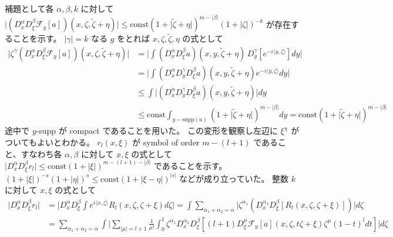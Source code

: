 \begin{Proof}
\itemthen
  補題として各 \(\alpha , \beta , k\) に対して \(\lvert (D^\alpha_x D^\beta_\xi \mathscr{F}_y[a])(x , \zeta , \tilde{\zeta} + \eta) \rvert \leq \text{const} (1 + \lvert \tilde{\zeta} + \eta \rvert)^{m - \lvert \beta \rvert} (1 + \lvert \zeta \rvert)^{-k}\) が存在することを示す。
  \(\lvert \gamma \rvert = k\) なる \(g\) をとれば \(x,\zeta,\tilde{\zeta},\eta\) の式として
  \begin{align*}
    \lvert \zeta^\gamma (D^\alpha_x D^\beta_\xi \mathscr{F}_y[a])(x , \zeta , \tilde{\zeta} + \eta) \rvert
    &= \lvert \int (D^\alpha_x D^\beta_\xi a)(x , y, \tilde{\zeta} + \eta) \, D^{\gamma}_y [e^{-i \langle y , \zeta \rangle}] dy \rvert \\
    &= \lvert \int (D^\alpha_x D^\gamma_y D^\beta_\xi a)(x , y, \tilde{\zeta} + \eta) e^{-i \langle y , \zeta \rangle} dy \rvert \\
    &\leq \int \lvert (D^\alpha_x D^\gamma_y D^\beta_\xi a)(x , y, \tilde{\zeta} + \eta) \rvert dy \\
    &\leq \text{const} \int_{y-\text{supp}(a)} (1 + \lvert \tilde{\zeta} + \eta \rvert)^{m - \lvert \beta \rvert} dy = \text{const} (1 + \lvert \tilde{\zeta} + \eta \rvert)^{m - \lvert \beta \rvert}
  \end{align*}
  途中で \(y\)-supp が compact であることを用いた。
  この変形を観察し左辺に \(\xi^\chi\) がついてもよいとわかる。
\itemthen
  \(r_l(x,\xi)\) が symbol of order \(m - (l + 1)\) であること、すなわち各 \(\alpha , \beta\) に対して \(x , \xi\) の式として \(\lvert D^\alpha_x D^\beta_\xi r_l \rvert \leq \text{const} (1 + \lvert \xi \rvert)^{m - (l + 1) - \lvert \beta \rvert}\) であることを示す。
  \((1 + \lvert \xi \rvert)^{-s} (1 + \lvert \eta \rvert)^{s} \leq \text{const} (1 + \lvert \xi - \eta \rvert)^{\lvert s \rvert}\) などが成り立っていた。
  整数 \(k\) に対して \(x,\xi\) の式として
  \begin{align*}
    \lvert D^\alpha_x D^\beta_\xi r_l \rvert
    &= \lvert D^{\alpha}_x D^{\beta}_\xi \int e^{i \langle x , \zeta \rangle} R_l(x , \zeta , \zeta + \xi) d\zeta \rvert
      = \int \sum_{\alpha_1 + \alpha_2 = \alpha} \lvert \zeta^{\alpha_1} (D^{\alpha_2}_x D^{\beta}_\xi [R_l(x , \zeta , \zeta + \xi)]) \rvert d\zeta \\
    &= \sum_{\alpha_1 + \alpha_2 = \alpha} \int \lvert \sum_{\lvert \mu \rvert = l + 1} \frac{1}{\mu !}
      \int_0^1 \zeta^{\alpha_1} D^{\alpha_2}_x D^\beta_\xi \left[(l + 1) D^\mu_\xi \mathscr{F}_y[a](x , \zeta , t \zeta + \xi) \zeta^\mu (1 - t)^l d t \right] \rvert d\zeta \\

\end{align*}
\end{Proof}
